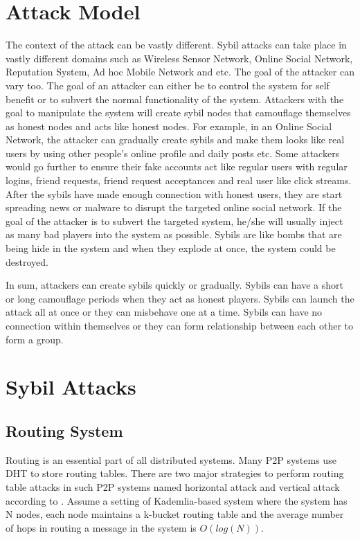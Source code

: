 \documentclass[conference]{IEEEtran}
\begin{document}
\section{Attack Model}
The context of the attack can be vastly different. Sybil attacks can take place in vastly different domains such as Wireless Sensor Network, Online Social Network, 
Reputation System, Ad hoc Mobile Network and etc. The goal of the attacker can vary too. The goal of an attacker can either be to control the system for self benefit
or to subvert the normal functionality of the system. Attackers with the goal to manipulate the system will create sybil nodes that camouflage themselves as honest nodes and
acts like honest nodes. For example, in an Online Social Network, the attacker can gradually create sybils and make them looks like real users by using other people's
online profile and daily posts etc. Some attackers would go further to ensure their fake accounts act like regular users with regular logins, friend requests,
friend request acceptances and real user like click streams. After the sybils have made enough connection with honest users, they are start spreading news or malware 
to disrupt the targeted online social network. If the goal of the attacker is to subvert the targeted system, he/she will usually inject as many bad players into the system
as possible. Sybils are like bombs that are being hide in the system and when they explode at once, the system could be destroyed.

In sum, attackers can create sybils quickly or gradually. Sybils can have a short or long camouflage periods when they act as honest players.
Sybils can launch the attack all at once or they can misbehave one at a time. Sybils can have no connection within themselves or they can form relationship between each other
to form a group.

\section{Sybil Attacks} \label{SybilAttacks}
\subsection{Routing System}
Routing is an essential part of all distributed systems. Many P2P systems use DHT to store routing tables.
There are two major strategies to perform routing table attacks in such P2P systems named horizontal attack and vertical attack according to \cite{wang12dht}.
Assume a setting of Kademlia-based system\cite{maymounkov02kademlia} where the system has N nodes, each node maintains a k-bucket routing table and
the average number of hops in routing a message in the system is $O(log(N))$.
\end{document}
